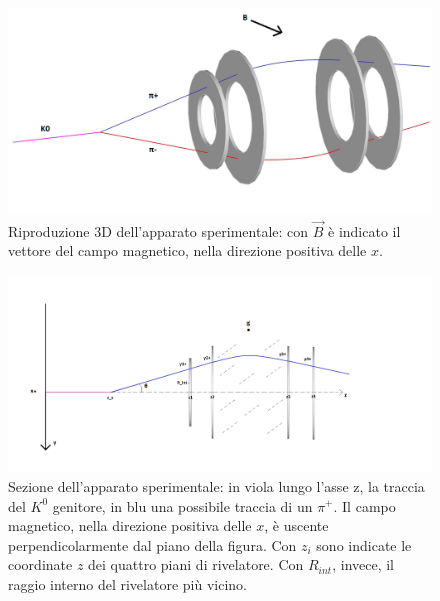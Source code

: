 \documentclass[8pt]{extarticle}
\begin{document}
\begin{figure}
	\begin{center}
		\includegraphics[scale=0.4]{apparato_3d} 
		\caption{Riproduzione 3D dell'apparato sperimentale: con $\vec{B}$ è indicato il vettore del campo magnetico, nella direzione positiva delle $x$.}
		\label{fig:apparato_3d}
	\end{center}
\end{figure}

\begin{figure}
	\begin{center}
		\includegraphics[scale=0.4]{apparato_2d}
		\caption{Sezione dell'apparato sperimentale: in viola lungo l'asse z, la traccia del $K^0$ genitore, in blu una possibile traccia di un $\pi^+$. Il campo magnetico, nella direzione positiva delle $x$, è uscente perpendicolarmente dal piano della figura. Con $z_i$ sono indicate le coordinate $z$ dei quattro piani di rivelatore. Con $R_{int}$, invece, il raggio interno del rivelatore più vicino.}
		\label{fig:apparato_2d}
	\end{center}
\end{figure}
\end{document}

